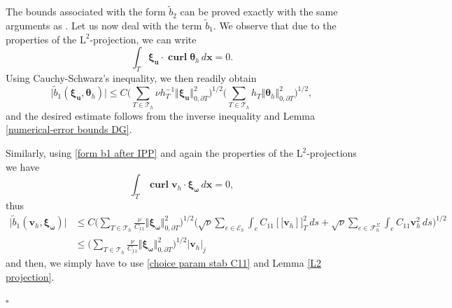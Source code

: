 \documentclass[reqno,a4paper]{article}
\numberwithin{equation}{section}
\newcommand\bu{\boldsymbol{u}}
\newcommand\bv{\boldsymbol{v}}
\newcommand\bx{\boldsymbol{x}}
\newcommand\cT{\mathcal{T}}
\newcommand\cE{{\mathcal{E}}}
\newcommand\cF{{\mathcal{F}}}
\renewcommand\L{\mathrm{L}}
\newcommand\bomega{\boldsymbol{\omega}}
\newcommand\btheta{\boldsymbol{\theta}}
\newcommand\bxi{\boldsymbol{\xi}}
\newcommand\curl{\mathop{\mathbf{curl}}\nolimits}
\newcommand{\jumpT}[1]{{\left[\![#1\right]\!]}_T}
\newenvironment{proof}{\noindent{\it Proof.}}{\hfill$\square$}
\begin{document}
\begin{proof}
 The bounds associated with the form $\tilde b_{2}$ can be proved exactly with the same arguments as
 \cite[Section 3.3]{Cockburn_SIAM2002}. Let us now deal with the term
 $\tilde b_{1}$. We observe that due to the properties of the $\L^2$-projection, we can write 
 \begin{equation*}
  \int_{T} \bxi_{\bu}\cdot \curl \btheta_{h}\, d\bx =0.
 \end{equation*}
Using Cauchy-Schwarz's inequality, we then readily obtain
\begin{equation*}
  \vert\tilde b_{1}(\bxi_{\bu},\btheta_h)\vert \leq  C\Big (\sum_{T\in\cT_h} \nu h_T^{-1}\Vert\bxi_{\bu}\Vert^{2}_{0,\partial T} \Big)^{1/2} \Big (\sum_{T\in\cT_h} h_T\Vert\btheta_{h}\Vert^{2}_{0,\partial T} \Big)^{1/2},
\end{equation*}
and  the desired estimate follows from the inverse inequality and
Lemma \ref{numerical-error bounds DG}.

\noindent Similarly, using \eqref{form b1 after IPP}
and again the properties of the $\L^{2}$-projections we have
\begin{equation*}
\int_{T} \curl \bv_h \cdot \bxi_{\bomega}\, d\bx=0,
\end{equation*}
thus 
 \begin{align*}
  \vert\tilde b_{1}(\bv_h,\bxi_{\bomega})\vert
  &\leq  C\Big (\sum_{T\in\cT_h} \frac{\nu}{\underline{C_{11}}}\Vert\bxi_{\bomega}\Vert^{2}_{0,\partial T} \Big)^{1/2} \Big(\sqrt{\nu}\sum_{e\in\cE_{h}}\int_{e} C_{11} \jumpT{\bv_h}^{2}\,ds +\sqrt{\nu} \sum_{e\in\cF_h^{\Sigma}}\int_{e}C_{11}\bv_h^{2} \,ds \Big )^{1/2} \\
  & \leq \Big (\sum_{T\in\cT_h} \frac{\nu}{\underline{C_{11}}}\Vert\bxi_{\bomega}\Vert^{2}_{0,\partial T} \Big)^{1/2} \vert\bv_{h}\vert_{j}
\end{align*}
%
and then, we simply have to use \eqref{choice param stab C11} and Lemma \ref{L2 projection}. 


\end{proof}
\end{document}
